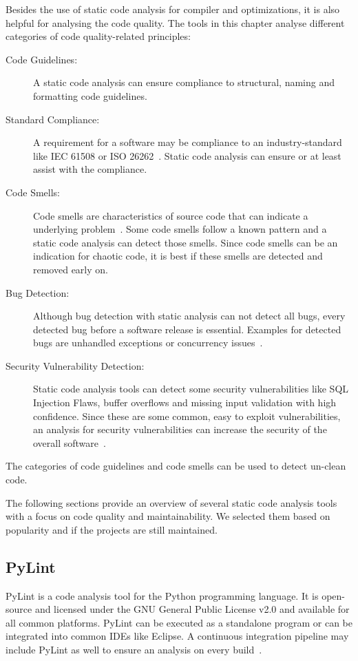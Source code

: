 Besides the use of static code analysis for compiler and optimizations, it is also helpful for analysing the code quality. The tools in this chapter analyse different categories of code quality-related principles:
\begin{description}
    \item[Code Guidelines:] A static code analysis can ensure compliance to structural, naming and formatting code guidelines. 
    \item[Standard Compliance:] A requirement for a software may be compliance to an industry-standard like IEC 61508 or ISO 26262~\cite{tc_65sc_65a_iec_2010-1,isotc_22sc_32_iso_2018}. Static code analysis can ensure or at least assist with the compliance.  
    \item[Code Smells:] Code smells are characteristics of source code that can indicate a underlying problem~\cite{fowler2018refactoring}. Some code smells follow a known pattern and a static code analysis can detect those smells. Since code smells can be an indication for chaotic code, it is best if these smells are detected and removed early on.
    \item[Bug Detection:] Although bug detection with static analysis can not detect all bugs, every detected bug before a software release is essential. Examples for detected bugs are unhandled exceptions or concurrency issues~\cite{delaitre_evaluating_2015}.
    \item[Security Vulnerability Detection:] Static code analysis tools can detect some security vulnerabilities like SQL Injection Flaws, buffer overflows and missing input validation with high confidence. Since these are some common, easy to exploit vulnerabilities, an analysis for security vulnerabilities can increase the security of the overall software~\cite{wichers_source_nodate}.  
\end{description}
The categories of code guidelines and code smells can be used to detect un-clean code.

The following sections provide an overview of several static code analysis tools with a focus on code quality and maintainability. We selected them based on popularity and if the projects are still maintained.

\subsection{PyLint}
PyLint is a code analysis tool for the Python programming language. It is open-source and licensed under the GNU General Public License v2.0 and available for all common platforms. PyLint can be executed as a standalone program or can be integrated into common IDEs like Eclipse. A continuous integration pipeline may include PyLint as well to ensure an analysis on every build~\cite{noauthor_pylint_nodate}.

